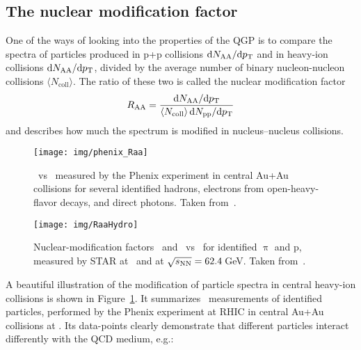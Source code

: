 \subsection{The nuclear modification factor \Raa}
One of the ways of looking into the properties of the QGP is to compare the spectra of particles produced in p+p collisions $\mathrm{d} N_\mathrm{AA}/\mathrm{d} {p_{\mathrm{T}}}$ and in heavy-ion collisions $\mathrm{d} N_\mathrm{AA}/\mathrm{d} {p_{\mathrm{T}}}$, divided by the average number of binary nucleon-nucleon collisions $\langle N_\mathrm{coll} \rangle$. The ratio of these two is called the nuclear modification factor \Raa
\begin{equation}
R_\text{AA} = \frac{\mathrm{d} N_\mathrm{AA}/\mathrm{d} {p_{\mathrm{T}}}}
{\langle N_\mathrm{coll} \rangle\, \mathrm{d} N_\mathrm{pp}/\mathrm{d} {p_{\mathrm{T}}}}
\end{equation}
and describes how much the spectrum is modified in nucleus--nucleus collisions.

\begin{figure}[!htb]
\centering
\texttt{[image: img/phenix\_Raa]}
\caption[\Raa\ vs \pt\ for $\uppi^0$, electrons from open-heavy-flavor decays, and direct photons.]{\label{PhenixRaa}\Raa\ vs \pt\, measured by the Phenix experiment in central Au+Au collisions for several identified hadrons, electrons from open-heavy-flavor decays, and direct photons. Taken from~\cite{PhenixDecadal}\@.}

\end{figure}


\begin{figure}[!htb]
\centering
\texttt{[image: img/RaaHydro]}
\caption[Nuclear-modification factors \Raa\ and \Rcp\ vs \pt\ for identified $\uppi$ and p, measured by STAR at \snnFull\ and at $\snn = 62.4\,$GeV\@.]{\label{RaaHydro}Nuclear-modification factors \Raa\ and \Rcp\ vs \pt\ for identified $\uppi$ and p, measured by STAR at \snnFull\ and at $\snn = 62.4\,$GeV\@. Taken from~\cite{RaaPiP}\@.}

\end{figure}

A beautiful illustration of the modification of particle spectra in central heavy-ion collisions is shown in Figure~\ref{PhenixRaa}\@. It summarizes \Raa\ measurements of identified particles, performed by the Phenix experiment at RHIC in central Au+Au collisions at \snnFull\@. Its data-points clearly demonstrate that different particles interact differently with the QCD medium, e.g.:


